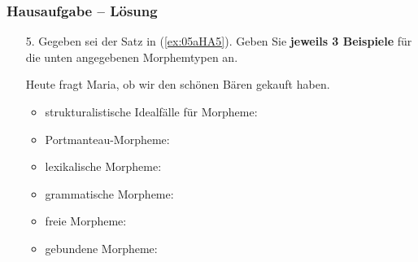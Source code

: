 \begin{frame}
\frametitle{Hausaufgabe -- Lösung}

\begin{enumerate}
	\item[5.] Gegeben sei der Satz in (\ref{ex:05aHA5}). Geben Sie \textbf{jeweils 3 Beispiele} für die unten angegebenen Morphemtypen an.
	
	\begin{exe}
		 Heute fragt Maria, ob wir den schönen Bären gekauft haben.
	\end{exe}
	
	\settowidth{}
	\begin{itemize}
		\item strukturalistische Idealfälle für Morpheme:
		\item[] 
		
		\item Portmanteau-Morpheme:
		\item[] 
		
		\item lexikalische Morpheme:
		\item[]  
		
		\item grammatische Morpheme:
		\item[] 
		
		\item freie Morpheme:
		\item[] 
		
		\item gebundene Morpheme:
		\item[] 
	\end{itemize}

\end{enumerate}

\end{frame}


